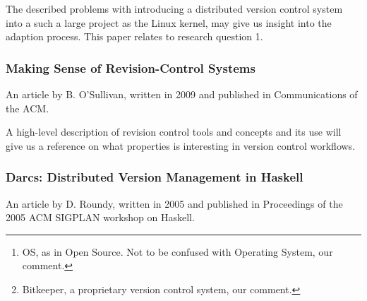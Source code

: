 \documentclass{article}
\begin{document}
\begin{abstract}
 Version management tools might be seen as a prerequisite for open
 source development today as projects become too large to be managed by
 maintainers alone. Yet the OS\footnote{ 
  OS, as in Open Source. Not to be confused with Operating System, our 
  comment.
 } process depends on fluid coordination and collaboration with the
 underlying qualities of this process based on firm trust and
 respect for fellow developers. This paper is a study of how
 debate over version tools reflects governance and decision making
 in an OS community. The paper is based on a study of the Linux kernel
 community as it first saw a partial acceptance of the CVS tool, and then
 later adopted BK\footnote{
  Bitkeeper, a proprietary version control system, our comment. 
 }. The paper explains the adoption process in relation to governance
 concerns, license issues, and questions of technical performance.
\end{abstract}

The described problems with introducing a distributed version control
system into a such a large project as the Linux kernel, may give us
insight into the adaption process. This paper relates to research
question 1.

\subsubsection{Making Sense of Revision-Control Systems}

An article by B. O'Sullivan, written in 2009 and published in
Communications of the ACM\cite{osullivan09}.

\begin{abstract}
 All revision-control systems come with complicated sets of trade-offs. How
 do you find the best match between tool and team?
\end{abstract}

A high-level description of revision control tools and concepts and its use
will give us a reference on what properties is interesting in version
control workflows.

\subsubsection{Darcs: Distributed Version Management in Haskell}

An article by D. Roundy, written in 2005 and published in Proceedings of the
2005 ACM SIGPLAN workshop on Haskell\cite{roundy05}.
\end{document}
